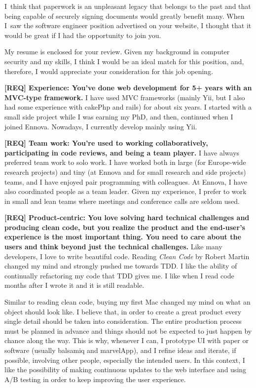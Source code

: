 \documentclass[a4paper,sans]{moderncv} %
\begin{document}
\makelettertitle %

\justify

I~think that paperwork is an unpleasant legacy that belongs to the past and that being capable of securely signing documents would greatly benefit many. When I~saw the software engineer position advertised on your website, I thought that it would be great if I had the opportunity to join you.

My resume is enclosed for your review. Given my background in computer security and my skills, I think I would be an ideal match for this position, and, therefore, I would appreciate your consideration for this job opening.

\textbf{[REQ] Experience: You’ve done web development for 5+ years with an MVC-type framework.}
I have used MVC frameworks (mainly Yii, but I also had some experience with cakePhp and rails) for about six years. I started with a small side project while I was earning my PhD, and then, continued when I joined Ennova. Nowadays, I currently develop mainly using Yii.

\textbf{[REQ] Team work: You’re used to working collaboratively, participating in code reviews, and being a team player.}
I have always preferred team work to solo work. I have worked both in large (for Europe-wide research projects) and tiny (at Ennova and for small research and side projects) teams, and I have enjoyed pair programming with colleagues. At Ennova, I have also coordinated people as a team leader.
Given my experience, I prefer to work in small and lean teams where meetings and conference calls are seldom used.

\textbf{[REQ] Product-centric: You love solving hard technical challenges and producing clean code, but you realize the product and the end-user’s experience is the most important thing. You need to care about the users and think beyond just the technical challenges.}
Like many developers, I love to write beautiful code. Reading \textit{Clean Code} by Robert Martin changed my mind and strongly pushed me towards TDD. I like the ability of continually refactoring my code that TDD gives me. I like when I read code months after I wrote it and it is still readable.

Similar to reading clean code, buying my first Mac changed my mind on what an object should look like.
I believe that, in order to create a great product every single detail should be taken into consideration.
The entire production process must be planned in advance and things should not be expected to just happen by chance along the way.
This is why, whenever I can, I prototype UI with paper or software (usually balsamiq and marvelApp), and I refine ideas and iterate, if possible, involving other people, especially the intended users.
In this context, I like the possibility of making continuous updates to the web interface and using A/B testing in order to keep improving the user experience.
\end{document}
